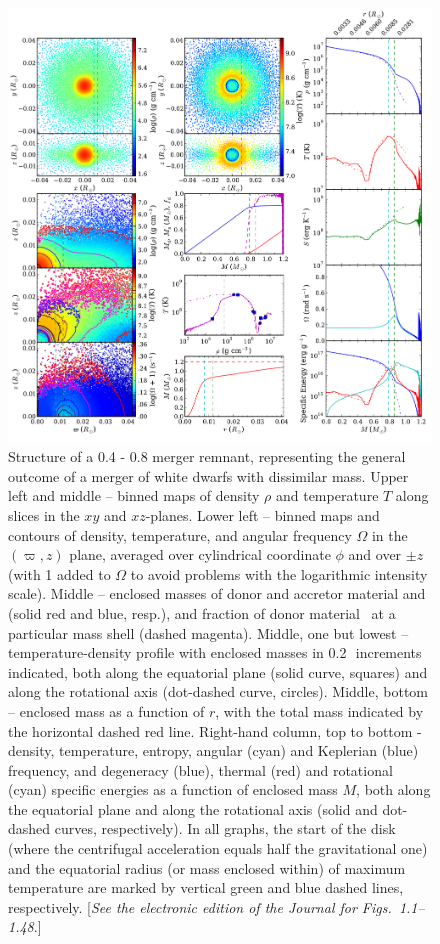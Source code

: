 \begin{figure}
\centering
\includegraphics[width=1.0\columnwidth]{chapter2_zhu+13/figures/pt4pt8.pdf}
\caption{Structure of a 0.4 - 0.8 {\Msun} merger remnant, representing the general outcome of a merger of white dwarfs with dissimilar mass.  Upper left and middle -- binned maps of density $\rho$ and temperature $T$ along slices in the $xy$ and $xz$-planes.  Lower left -- binned maps and contours of density, temperature, and angular frequency $\Omega$ in the $(\varpi,z)$ plane, averaged over cylindrical coordinate $\phi$ and over $\pm z$ (with 1 added to $\Omega$ to avoid problems with the logarithmic intensity scale).  Middle -- enclosed masses of donor and accretor material {\Md} and {\Ma} (solid red and blue, resp.), and fraction of donor material \fdon\ at a particular mass shell (dashed magenta).  Middle, one but lowest -- temperature-density profile with enclosed masses in 0.2\,\Msun\ increments indicated, both along the equatorial plane (solid curve, squares) and along the rotational axis (dot-dashed curve, circles).  Middle, bottom -- enclosed mass as a function of $r$, with the total mass indicated by the horizontal dashed red line.  Right-hand column, top to bottom - density, temperature, entropy, angular (cyan) and Keplerian (blue) frequency, and degeneracy (blue), thermal (red) and rotational (cyan) specific energies as a function of enclosed mass $M$, both along the equatorial plane and along the rotational axis (solid and dot-dashed curves, respectively).  In all graphs, the start of the disk (where the centrifugal acceleration equals half the gravitational one) and the equatorial radius (or mass enclosed within) of maximum temperature are marked by vertical green and blue dashed lines, respectively. [{\em See the electronic edition of the Journal for Figs.~1.1--1.48}.]}
\label{fig:mergersampling1}
\end{figure}


